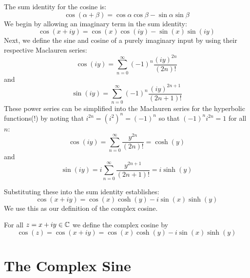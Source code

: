 \documentclass[handout]{ximera}
\begin{document}
The sum identity for the cosine is:
\[
\cos(\alpha + \beta) = \cos\alpha \cos \beta - \sin \alpha \sin \beta
\]
We begin by allowing an imaginary term in the sum identity:
\[
\cos(x+iy) = \cos(x) \cos(iy) - \sin(x) \sin(iy)
\]
Next, we define the sine and cosine of a purely imaginary input by using their respective Maclauren series:
\[
\cos(iy) = \sum_{n=0}^\infty (-1)^n \frac{(iy)^{2n}}{(2n)!} 
\]
and
\[
\sin(iy) = \sum_{n=0}^\infty (-1)^n \frac{(iy)^{2n+1}}{(2n+1)!} 
\]
These power series can be simplified into the Maclauren series for the hyperbolic functions(!) by 
noting that $i^{2n} = \left(i^2\right)^n = (-1)^n$ so that $(-1)^n i^{2n} = 1$ for all $n$: 
\[
\cos(iy) = \sum_{n=0}^\infty  \frac{y^{2n}}{(2n)!} = \cosh(y)
\]
and
\[
\sin(iy) = i\sum_{n=0}^\infty \frac {y^{2n+1}}{(2n+1)!}= i\sinh(y)
\]

Substituting these into the sum identity establishes:
\[
\cos(x+iy) = \cos(x) \cosh(y) - i\sin(x) \sinh(y)
\]
We use this as our definition of the complex cosine.
\begin{definition}
For all $z = x+iy \in \mathbb C$ we define the complex cosine by
\[
\cos(z) = \cos(x+iy) = \cos(x) \cosh(y) - i\sin(x) \sinh(y)
\]
\end{definition}


\section{The Complex Sine}
\end{document}
